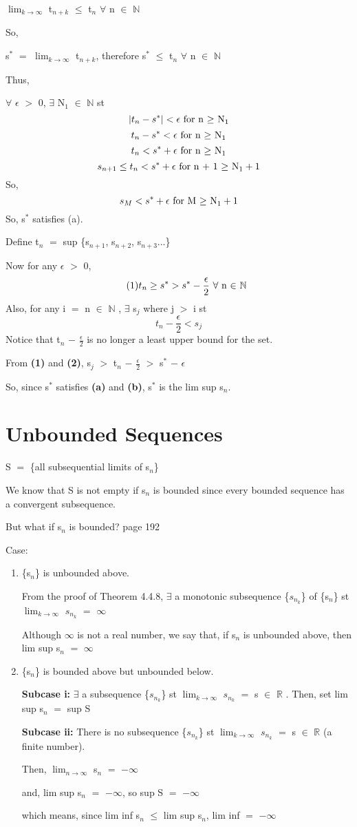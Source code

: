 \documentclass{article}
\newcommand{\mt}[1]{\ensuremath{#1}}
\newcommand\bsc[2][\DefaultOpt]{%
  \def\DefaultOpt{#2}%
  \section[#1]{#2}%
}
\newcommand{\elist}{\end{enumerate}}
\newcommand{\bilist}{\begin{enumerate}[label=\roman*)]}
\newcommand{\bpth}[1]{\textbf{(#1)}}
\newcommand{\step}[2]{\begin{equation}\tag{#2}#1\end{equation}}
\newcommand{\dbs}[3]{\mt{#1_{#2_#3}}}
\newcommand{\br}{\mt{\mathbb{R}} }       %
\newcommand{\bn}{\mt{\mathbb{N}} }       %
\newcommand{\ep}{\mt{\epsilon} }         %
\newcommand{\fa}{\mt{\forall} }          %
\newcommand{\mem}{\mt{\in} }
\newcommand{\exs}{\mt{\exists} }
\newcommand{\bk}[1]{\{#1\}}
\newcommand{\ms}{\mt{-} }
\newcommand{\gr}{\mt{>} }
\newcommand{\lse}{\mt{\leq} }
\newcommand{\gre}{\mt{\geq} }
\newcommand{\eql}{\mt{=} }
\newcommand{\uw}[2]{#1\mt{_{#2}}}
\newcommand{\uf}[2]{#1\mt{^{#2}}}
\newcommand{\frc}[2]{\mt{\frac{#1}{#2}}}
\newcommand{\lmti}[1]{\mt{\displaystyle{\lim_{#1 \to \infty}}}}
\newcommand{\eqn}[1]{\[#1\]}
\newcommand{\infy}{\mt{\infty} }
\begin{document}
{\lmti{k} \uw{t}{n + k} \lse \uw{t}{n} \fa n \mem \bn

So,

\uf{s}{*} \eql \lmti{k} \uw{t}{n + k}, therefore \uf{s}{*} \lse \uw{t}{n} \fa n \mem \bn

Thus,

\fa \ep \gr 0, \exs \uw{N}{1} \mem \bn st 
\eqn{|t_n - s^*| < \epsilon \textrm{ for n \gre N}_1}
\eqn{t_n - s^* < \epsilon \textrm{ for n \gre N}_1}
\eqn{t_n < s^* + \epsilon \textrm{ for n \gre N}_1}
\eqn{s_{n + 1} \lse t_n < s^* + \epsilon \textrm{ for n + 1 \gre N}_1 + 1}
So,
\eqn{s_M < s^* + \epsilon \textrm{ for M \gre N}_1 + 1}
So, \uf{s}{*} satisfies (a).

Define \uw{t}{n} \eql sup \bk{\uw{s}{n + 1}, \uw{s}{n + 2}, \uw{s}{n + 3}...}

Now for any \ep \gr 0,
\step{t_n \gre s^* > s^* - \frac{\epsilon}{2} \textrm{ \fa n \mem \bn}}{1}
Also, for any i \eql n \mem \bn, \exs \uw{s}{j} where j \gr i st
\step{t_n - \frac{\epsilon}{2} < s_j}{2}
Notice that \uw{t}{n} \ms \frc{\epsilon}{2} is no longer a least upper bound for the set.

From \bpth{1} and \bpth{2}, \uw{s}{j} \gr \uw{t}{n} \ms \frc{\epsilon}{2} \gr \uf{s}{*} \ms \ep

So, since \uf{s}{*} satisfies \bpth{a} and \bpth{b}, \uf{s}{*} is the lim sup \uw{s}{n}.
}

\bsc{Unbounded Sequences}{
S \eql \bk{all subsequential limits of \uw{s}{n}}

We know that S is not empty if \uw{s}{n} is bounded since every bounded sequence has a convergent subsequence.

But what if \uw{s}{n} is bounded? page 192

Case:
\bilist
\item \bk{\uw{s}{n}} is unbounded above.
	
	From the proof of Theorem 4.4.8, \exs a monotonic subsequence \bk{\dbs{s}{n}{k}} of \bk{\uw{s}{n}} st \lmti{k} \dbs{s}{n}{k} \eql \infy
	
	Although \infy is not a real number, we say that, if \uw{s}{n} is unbounded above, then lim sup \uw{s}{n} \eql \infy
\item \bk{\uw{s}{n}} is bounded above but unbounded below.
	
	\textbf{Subcase i:} \exs a subsequence \bk{\dbs{s}{n}{k}} st \lmti{k} \dbs{s}{n}{k} \eql s \mem \br. Then, set lim sup \uw{s}{n} \eql sup S
	
	\textbf{Subcase ii:} There is no subsequence \bk{\dbs{s}{n}{k}} st \lmti{k} \dbs{s}{n}{k} \eql s \mem \br (a finite number).
	
	Then, \lmti{n} \uw{s}{n} \eql $-\infty$
	
	and, lim sup \uw{s}{n} \eql $-\infty$, so sup S \eql $-\infty$
	
	which means, since lim inf \uw{s}{n} \lse lim sup \uw{s}{n}, lim inf \eql $-\infty$
	
	
	
\elist
}
\end{document}
